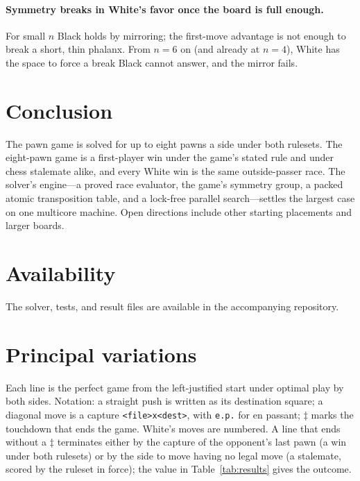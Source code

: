 \documentclass[11pt]{article}
\theoremstyle{plain}
\theoremstyle{definition}
\begin{document}
\paragraph{Symmetry breaks in White's favor once the board is full enough.} For
small $n$ Black holds by mirroring; the first-move advantage is not enough to
break a short, thin phalanx. From $n=6$ on (and already at $n=4$), White has the
space to force a break Black cannot answer, and the mirror fails.

\section{Conclusion}

The pawn game is solved for up to eight pawns a side under both rulesets. The
eight-pawn game is a first-player win under the game's stated rule and under chess
stalemate alike, and every White win is the same outside-passer race. The solver's
engine---a proved race evaluator, the game's symmetry group, a packed atomic
transposition table, and a lock-free parallel search---settles the largest case on
one multicore machine. Open directions include other starting placements and larger
boards.

\section*{Availability}

The solver, tests, and result files are available in the accompanying repository.

\appendix
\section{Principal variations}\label{app:pv}

Each line is the perfect game from the left-justified start under optimal play by
both sides. Notation: a straight push is written as its destination square; a
diagonal move is a capture \texttt{<file>x<dest>}, with \texttt{e.p.} for en
passant; $\ddagger$ marks the touchdown that ends the game. White's moves are
numbered. A line that ends without a $\ddagger$ terminates either by the capture of
the opponent's last pawn (a win under both rulesets) or by the side to move having
no legal move (a stalemate, scored by the ruleset in force); the value in
Table~\ref{tab:results} gives the outcome.

\newcommand{\pvitem}[2]{\item[$n=#1$]\ #2}
\end{document}
